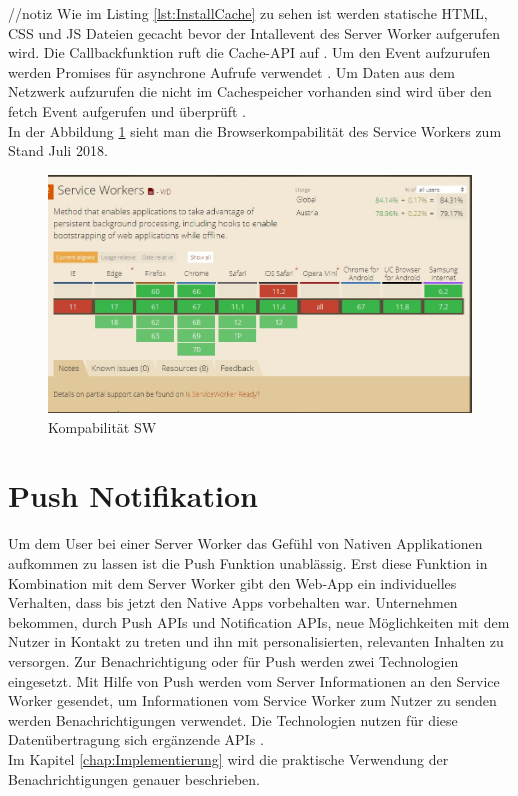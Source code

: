 //notiz
Wie im Listing \ref{lst:InstallCache}  zu  sehen ist werden statische HTML, CSS und JS Dateien gecacht bevor der Intallevent des Server Worker aufgerufen wird. Die Callbackfunktion ruft die Cache-API auf \cite{CacheAPI}.
Um den Event aufzurufen werden Promises für asynchrone Aufrufe verwendet .
Um Daten aus dem Netzwerk aufzurufen die nicht im Cachespeicher vorhanden sind wird über den fetch Event aufgerufen und überprüft \cite{Promises}.
\\
In der Abbildung \ref{fig:BrowserSW} sieht man die Browserkompabilität des Service Workers zum Stand Juli 2018.




\begin{figure}[h]
	\centering
	\includegraphics[width=14cm]{BilderAllgemein/BrowserSW}\medskip
	\caption{Kompabilität \acl{SW} \cite{BrowserSupport}}
	\label{fig:BrowserSW}
\end{figure}


\section{Push Notifikation}
Um dem User bei einer Server Worker das Gefühl von Nativen Applikationen aufkommen zu lassen ist die Push Funktion unablässig. Erst diese Funktion in Kombination mit dem Server Worker gibt den \acl{Web-App} ein individuelles Verhalten, dass bis jetzt den Native Apps vorbehalten war.
Unternehmen bekommen, durch Push APIs und Notification APIs, neue Möglichkeiten mit dem Nutzer in Kontakt zu treten und ihn mit personalisierten, relevanten Inhalten zu versorgen.
Zur Benachrichtigung oder für Push werden zwei Technologien eingesetzt. Mit Hilfe von Push werden vom Server Informationen an den Service Worker gesendet, um Informationen vom Service Worker zum Nutzer zu senden werden Benachrichtigungen verwendet. Die Technologien nutzen für diese Datenübertragung sich ergänzende APIs \cite{PushNotifikation}. \\
Im Kapitel \ref{chap:Implementierung} wird die praktische Verwendung der Benachrichtigungen genauer beschrieben.  
 

